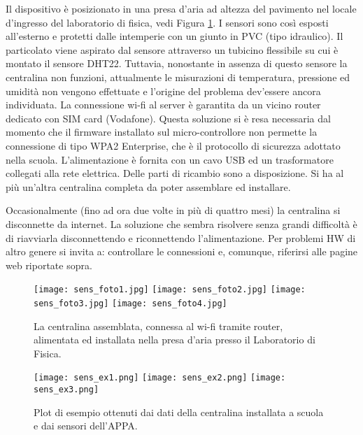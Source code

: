 \documentclass{article}
\begin{document}
Il dispositivo è posizionato in una presa d'aria ad altezza del pavimento nel locale d'ingresso del laboratorio di fisica, vedi Figura \ref{fig:sens_foto}. I sensori sono così esposti all'esterno e protetti dalle intemperie con un giunto in PVC (tipo idraulico). Il particolato viene aspirato dal sensore attraverso un tubicino flessibile su cui è montato il sensore DHT22. Tuttavia, nonostante in assenza di questo sensore la centralina non funzioni, attualmente le misurazioni di temperatura, pressione ed umidità non vengono effettuate e l'origine del problema dev'essere ancora individuata. La connessione wi-fi al server è garantita da un vicino router dedicato con SIM card (Vodafone). Questa soluzione si è resa necessaria dal momento che il firmware installato sul micro-controllore non permette la connessione di tipo WPA2 Enterprise, che è il protocollo di sicurezza adottato nella scuola. L'alimentazione è fornita con un cavo USB ed un trasformatore collegati alla rete elettrica. Delle parti di ricambio sono a disposizione. Si ha al più un'altra centralina completa da poter assemblare ed installare. 

Occasionalmente (fino ad ora due volte in più di quattro mesi) la centralina si disconnette da internet. La soluzione che sembra risolvere senza grandi difficoltà è di riavviarla disconnettendo e riconnettendo l'alimentazione. Per problemi HW di altro genere si invita a: controllare le connessioni e, comunque, riferirsi alle pagine web riportate sopra.

\begin{figure}
\begin{center}
\texttt{[image: sens\_foto1.jpg]}
\texttt{[image: sens\_foto2.jpg]}
\texttt{[image: sens\_foto3.jpg]}
\texttt{[image: sens\_foto4.jpg]}
\end{center}
\label{fig:sens_foto}
\caption{La centralina assemblata, connessa al wi-fi tramite router, alimentata ed installata nella presa d'aria presso il Laboratorio di Fisica.}
\end{figure}

\begin{figure}
\begin{center}
\texttt{[image: sens\_ex1.png]}
\texttt{[image: sens\_ex2.png]}
\texttt{[image: sens\_ex3.png]}
\end{center}
\label{fig:sens_ex}
	\caption{Plot di esempio ottenuti dai dati della centralina installata a scuola e dai sensori dell'APPA.}
\end{figure}
\end{document}
